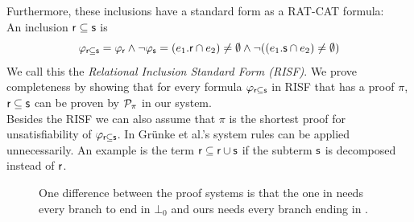 \documentclass[a4paper,twoside,12pt, english]{article}
\begin{document}
\noindent Furthermore, these inclusions have a standard form as a RAT-CAT formula: \\
An inclusion $\textsf{\upshape r} \subseteq \textsf{\upshape s}$ is
\[\varphi_{\textsf{\upshape r} \subseteq \textsf{\upshape s}} = \varphi_{\textsf{\upshape r}} \land \neg \varphi_{\textsf{\upshape s}} = (e_1.\textsf{\upshape r} \cap e_2) \neq \emptyset \land \neg((e_1.\textsf{\upshape s} \cap e_2) \neq \emptyset)\]
We call this the \textit{Relational Inclusion Standard Form (RISF)}.
We prove completeness by showing that for every formula $\varphi_{\textsf{\upshape r} \subseteq \textsf{\upshape s}}$ in RISF that has a proof $\pi$, $\textsf{\upshape r} \subseteq \textsf{\upshape s}$ can be proven by $\mathcal{P}_\pi$ in our system. \\
Besides the RISF we can also assume that $\pi$ is the shortest proof for unsatisfiability of $\varphi_{\textsf{\upshape r} \subseteq \textsf{\upshape s}}$. In Grünke et al.'s system rules can be applied unnecessarily. An example is the term $\textsf{\upshape r} \subseteq \textsf{\upshape r} \cup \textsf{\upshape s}$ if the subterm $\textsf{\upshape s}$ is decomposed instead of $\textsf{\upshape r}$.

\begin{figure}
\vspace{-0.7cm}
\begin{minipage}{0.2\textwidth}
\centering
{}
\end{minipage}\begin{minipage}{0.2\textwidth}
\centering
{}
\end{minipage}\caption{One difference between the proof systems is that the one in \cite{Gru+26} needs every branch to end in $\bot_0$ and ours needs every branch ending in \true .}
\end{figure}
\end{document}
